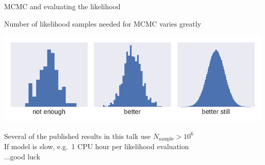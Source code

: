 \documentclass{beamer}
\begin{document}
\begin{frame}{MCMC and evaluating the likelihood}
  \begin{center}
    Number of likelihood samples needed for MCMC varies greatly
  \end{center}
  \includegraphics[width=\textwidth]{mcmc}\\
  \begin{center}
    Several of the published results in this talk use $N_\text{sample} > 10^6$\\
    If model is slow, e.g.\ 1 CPU hour per likelihood evaluation\\
     ...good luck
  \end{center}
\end{frame}
\end{document}
